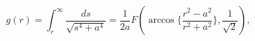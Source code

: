 \begin{equation}
g(r)=
\int^{\infty}_{r}{\frac{ds}{\sqrt{s^4+a^4}}}=\frac{1}{2a}
F(\arccos{\{ \frac{r^2- a^2}{r^2+a^2}} \},\frac{1}{\sqrt{2}}),
\label{gPleb}
\end{equation}

